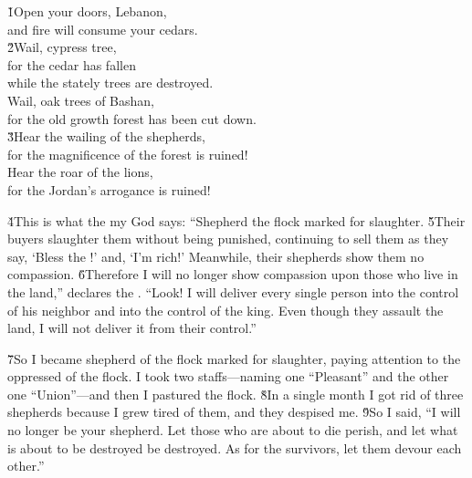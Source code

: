 \begin{poetry}
\poeml {}
\v{1}Open your doors, Lebanon, \\
\poemll    and fire will consume your cedars. \\
\poeml \v{2}Wail, cypress tree, \\
\poemll    for the cedar has fallen \\
\poemlll       while the stately trees are destroyed. \\
\poeml Wail, oak trees of Bashan, \\
\poemll    for the old growth forest has been cut down. \\
\poeml \v{3}Hear the wailing of the shepherds, \\
\poemll    for the magnificence of the forest is ruined! \\
\poeml Hear the roar of the lions, \\
\poemll    for the Jordan's arrogance is ruined!
\end{poetry}

\v{4}This is what the  my God says: ``Shepherd the flock marked for slaughter. \v{5}Their buyers slaughter them without being punished, continuing to sell them as they say, `Bless the !' and, `I'm rich!' Meanwhile, their shepherds show them no compassion. \v{6}Therefore I will no longer show compassion upon those who live in the land,'' declares the . ``Look! I will deliver every single person into the control of his neighbor and into the control of the king. Even though they assault the land, I will not deliver it from their control.''

\v{7}So I became shepherd of the flock marked for slaughter, paying attention to the oppressed of the flock. I took two staffs---naming one ``Pleasant'' and the other one ``Union''---and then I pastured the flock. \v{8}In a single month I got rid of three shepherds because I grew tired of them, and they despised me. \v{9}So I said, ``I will no longer be your shepherd. Let those who are about to die perish, and let what is about to be destroyed be destroyed. As for the survivors, let them devour each other.''


